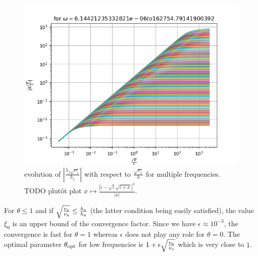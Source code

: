 \begin{figure}
    \centering
    \includegraphics[scale=0.6]{Figure_boundbulk.png}
    \caption{evolution of $|\frac{\lambda_j \sqrt{\nu_j}}{h_j}|$ with respect to $\frac{\sqrt{\nu_j}}{h}$ for multiple frequencies.
	{\color{red} TODO plutôt plot $x \mapsto \frac{|i-\sqrt{i}\sqrt{i+x}|^2}{|x|}$.}}
    \label{fig:figboundbulk}
\end{figure}
For $\theta \leq 1$ and if 
$\sqrt{\frac{\nu_{\rm o}}{\nu_{\rm a}}} \leq \frac{h_{\rm o}}{h_{\rm a}}$
(the latter condition being easily satisfied), 
the value $\xi_0$ is an upper bound 
of the convergence factor.
Since we have $\epsilon \approx 10^{-3}$, 
the convergence is fast for $\theta = 1$ whereas $\epsilon$
does not play any role for $\theta = 0$.
%
The optimal parameter $\theta_{\rm opt}$ for low frequencies is $1 +  \epsilon\sqrt{\frac{\nu_{\rm a}}{\nu_{\rm o}}}$ which is very close to $1$.
